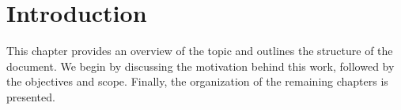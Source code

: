 \chapter{Introduction}
    This chapter provides an overview of the topic and outlines the structure of the document. 
    We begin by discussing the motivation behind this work, followed by the objectives and scope. 
    Finally, the organization of the remaining chapters is presented.